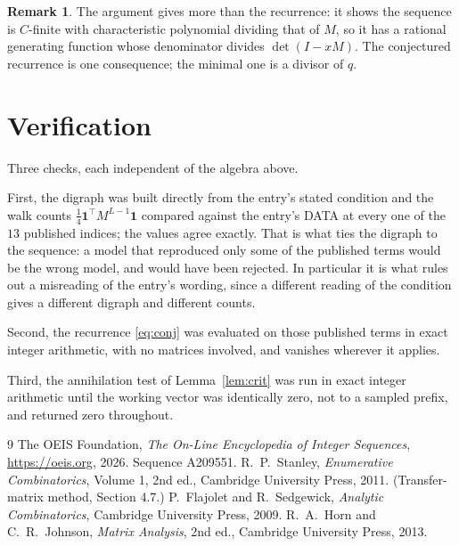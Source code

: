 \documentclass[11pt,a4paper]{article}
\theoremstyle{plain}
\theoremstyle{definition}
\newtheorem{remark}[theorem]{Remark}
\begin{document}
\begin{remark}
The argument gives more than the recurrence: it shows the sequence is $C$-finite with
characteristic polynomial dividing that of $M$, so it has a rational generating function
whose denominator divides $\det(I-xM)$. The conjectured recurrence is one consequence; the
minimal one is a divisor of $q$.
\end{remark}

\section{Verification}

Three checks, each independent of the algebra above.

First, the digraph was built directly from the entry's stated condition and the walk counts
$\tfrac1{4}\mathbf{1}^{\!\top}M^{L-1}\mathbf{1}$ compared against the entry's DATA at
every one of the $13$ published indices; the values agree exactly. That is what ties
the digraph to the sequence: a model that reproduced only some of the published terms would
be the wrong model, and would have been rejected. In particular it is what rules out a
misreading of the entry's wording, since a different reading of the condition gives a
different digraph and different counts.

Second, the recurrence \eqref{eq:conj} was evaluated on those published terms in exact
integer arithmetic, with no matrices involved, and vanishes wherever it applies.

Third, the annihilation test of Lemma~\ref{lem:crit} was run in exact integer arithmetic
until the working vector was identically zero, not to a sampled prefix, and returned zero
throughout.

\begin{thebibliography}{9}
 The OEIS Foundation, \emph{The On-Line Encyclopedia of Integer
Sequences}, \url{https://oeis.org}, 2026. Sequence A209551.
 R.~P.~Stanley, \emph{Enumerative Combinatorics}, Volume 1, 2nd ed.,
Cambridge University Press, 2011. (Transfer-matrix method, Section 4.7.)
 P.~Flajolet and R.~Sedgewick, \emph{Analytic Combinatorics}, Cambridge
University Press, 2009.
 R.~A.~Horn and C.~R.~Johnson, \emph{Matrix Analysis}, 2nd ed., Cambridge
University Press, 2013.
\end{thebibliography}
\end{document}
